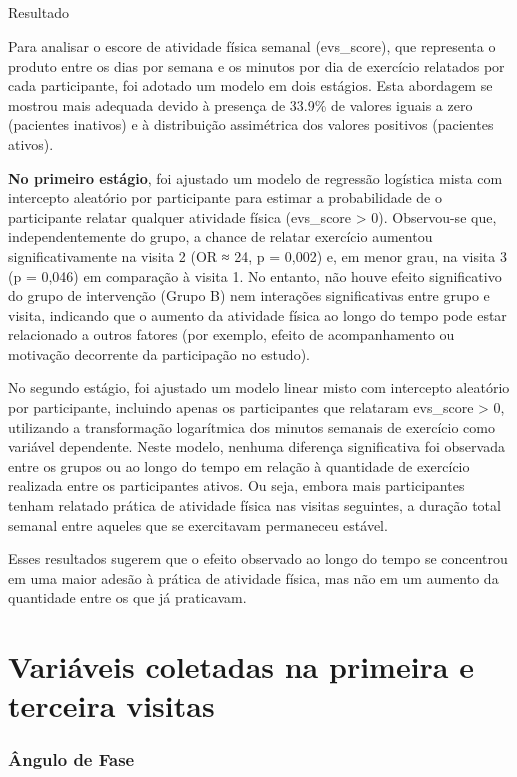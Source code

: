 \documentclass[
  12pt,
]{article}
\makeatletter
\let\oldsubparagraph\subparagraph
\renewcommand{\subparagraph}{
    \@ifstar
      \xxxSubParagraphStar
      \xxxSubParagraphNoStar
  }
\newcommand{\xxxSubParagraphStar}[1]{\oldsubparagraph*{#1}\mbox{}}
\newcommand{\xxxSubParagraphNoStar}[1]{\oldsubparagraph{#1}\mbox{}}
\makeatother
\begin{document}
\subparagraph{Resultado}\label{resultado-16}

Para analisar o escore de atividade física semanal (evs\_score), que
representa o produto entre os dias por semana e os minutos por dia de
exercício relatados por cada participante, foi adotado um modelo em dois
estágios. Esta abordagem se mostrou mais adequada devido à presença de
33.9\% de valores iguais a zero (pacientes inativos) e à distribuição
assimétrica dos valores positivos (pacientes ativos).

\textbf{No primeiro estágio}, foi ajustado um modelo de regressão
logística mista com intercepto aleatório por participante para estimar a
probabilidade de o participante relatar qualquer atividade física
(evs\_score \textgreater{} 0). Observou-se que, independentemente do
grupo, a chance de relatar exercício aumentou significativamente na
visita 2 (OR ≈ 24, p = 0,002) e, em menor grau, na visita 3 (p = 0,046)
em comparação à visita 1. No entanto, não houve efeito significativo do
grupo de intervenção (Grupo B) nem interações significativas entre grupo
e visita, indicando que o aumento da atividade física ao longo do tempo
pode estar relacionado a outros fatores (por exemplo, efeito de
acompanhamento ou motivação decorrente da participação no estudo).

No segundo estágio, foi ajustado um modelo linear misto com intercepto
aleatório por participante, incluindo apenas os participantes que
relataram evs\_score \textgreater{} 0, utilizando a transformação
logarítmica dos minutos semanais de exercício como variável dependente.
Neste modelo, nenhuma diferença significativa foi observada entre os
grupos ou ao longo do tempo em relação à quantidade de exercício
realizada entre os participantes ativos. Ou seja, embora mais
participantes tenham relatado prática de atividade física nas visitas
seguintes, a duração total semanal entre aqueles que se exercitavam
permaneceu estável.

Esses resultados sugerem que o efeito observado ao longo do tempo se
concentrou em uma maior adesão à prática de atividade física, mas não em
um aumento da quantidade entre os que já praticavam.

\section{Variáveis coletadas na primeira e terceira
visitas}\label{variuxe1veis-coletadas-na-primeira-e-terceira-visitas}

\subsubsection{Ângulo de Fase}\label{uxe2ngulo-de-fase}
\end{document}
